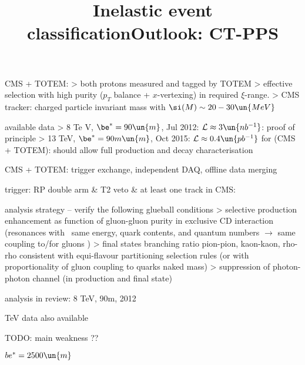 \> CMS + TOTEM:
\>> both protons measured and tagged by TOTEM
\>> effective selection with high purity ($p_T$ balance + $x$-vertexing) in required $\xi$-range.
\>> CMS tracker: charged particle invariant mass with $\si(M) \sim 20-30\un{MeV}$

\> available data
\>> 8 Te	V, $\be^* = 90\un{m}$, Jul 2012: ${\cal L} \approx 3\un{nb^{-1}}$: proof of principle
\>> 13 TeV, $\be^* = 90m\un{m}$, Oct 2015: ${\cal L} \approx 0.4\un{pb^{-1}}$ for (CMS + TOTEM): should allow full production and decay characterisation


\newpage %

\> CMS + TOTEM: trigger exchange, independent DAQ, offline data merging

\> trigger: RP double arm \& T2 veto \& at least one track in CMS:

\centerline{}

\> analysis strategy -- verify the following glueball conditions
\>> selective production enhancement as function of gluon-gluon purity in
exclusive CD interaction (resonances with ~same energy, quark
contents, and quantum numbers $\rightarrow$ same coupling to/for gluons )
\>> final states branching ratio pion-pion, kaon-kaon, rho-rho consistent
with equi-flavour partitioning selection rules (or with proportionality of
gluon coupling to quarks naked mass)
\>> suppression of photon-photon channel (in production and final state)



\newpage %
\title{Inelastic event classification}

\> analysis in review: 8 TeV, 90m, 2012

 TeV data also available

TODO: main weakness ??


\newpage %

\> $be^* = 2500\un{m}$

\newpage %
\title{Outlook: CT-PPS}


\newpage %
\title{}


